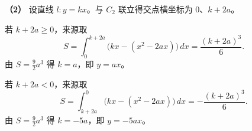 \begin{answer}
\textbf{（2）} 设直线 $l:y=kx$。与 $C_2$ 联立得交点横坐标为 $0$、$k+2a$。

若 $k+2a\ge0$，来源取
\nopagebreak[4]
\[S=\int_0^{k+2a}\bigl(kx-(x^2-2ax)\bigr)\,dx=\frac{(k+2a)^3}{6}.\]
由 $S=\frac92a^3$ 得 $k=a$，即 $y=ax$。

若 $k+2a<0$，来源取
\nopagebreak[4]
\[S=\int_{k+2a}^{0}\bigl(kx-(x^2-2ax)\bigr)\,dx=-\frac{(k+2a)^3}{6}.\]
由 $S=\frac92a^3$ 得 $k=-5a$，即 $y=-5ax$。


\gkanswer{答案（2）：$A_2$ 组，$\theta\in\left[\dfrac{3\pi}{4},\pi\right)$；$B_2$ 组，$y=ax$ 或 $y=-5ax$。}

\end{answer}
